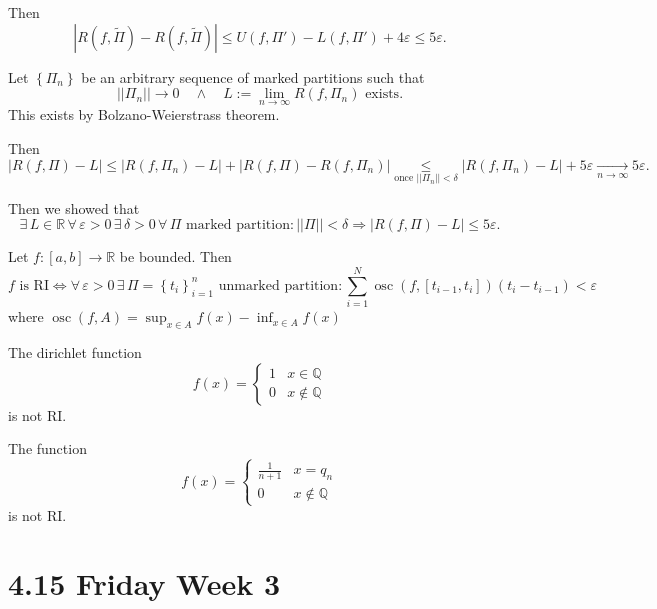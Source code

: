 \documentclass{notes}
\begin{document}
\begin{prf}
    Then 
    \[
      \left | R(f, \tilde \Pi) - R(f, \tilde \Pi) \right | \leq U(f, \Pi') - L(f, \Pi') + 4 \varepsilon \leq 5 \varepsilon.
    \]
    
    Let $\left \{ \Pi_n \right \}$ be an arbitrary sequence of marked partitions such that 
    \[
      ||\Pi_n|| \to 0 \quad \land \quad L := \lim_{n \to \infty} R(f, \Pi_n) \text{ exists}.
    \]
    This exists by Bolzano-Weierstrass theorem.
    
    Then 
    \[
      \left | R(f, \Pi) - L \right | \leq \left | R(f, \Pi_n) - L \right | + \left | R(f, \Pi) - R(f, \Pi_n) \right | \underset{\text{once } ||\Pi_n|| < \delta}{\leq} \left | R(f, \Pi_n) - L \right | + 5 \varepsilon \underset{n \to \infty}{\longrightarrow} 5 \varepsilon.
    \]
    
    Then we showed that 
    \[
      \exists \, L \in \mathbb R \, \forall \, \varepsilon > 0 \, \exists \, \delta > 0 \, \forall \, \Pi \text{ marked partition}: ||\Pi|| < \delta \Rightarrow \left | R(f, \Pi) - L \right | \leq 5 \varepsilon.
    \]
  \end{prf}
  
  \begin{cor}
    Let $f \colon [a, b] \to \mathbb R$ be bounded.
    Then 
    \[
      \text{$f$ is RI} \Leftrightarrow \forall \, \varepsilon > 0 \, \exists \, \Pi = \left \{ t_i \right \}_{i = 1}^n \text{ unmarked partition}: \sum_{i = 1}^N \operatorname{osc}(f, [t_{i - 1}, t_i])(t_i - t_{i - 1}) < \varepsilon
    \]
    where $\operatorname{osc}(f, A) = \sup_{x \in A} f(x) - \inf_{x \in A} f(x)$
  \end{cor}
  
  \begin{eg}
    The dirichlet function 
    \[
      f(x) = \begin{cases}
        1 & x \in \mathbb Q \\ 
        0 & x \not \in \mathbb Q
      \end{cases}
    \]
    is not RI.
  \end{eg}
  
  \begin{eg}
    The function 
    \[
      f(x) = \begin{cases}
        \frac{1}{n + 1} & x = q_n \\ 
        0 & x \not \in \mathbb Q
      \end{cases}
    \]
    is not RI.
  \end{eg}
  
  \section{4.15 Friday Week 3}
  
\end{document}
